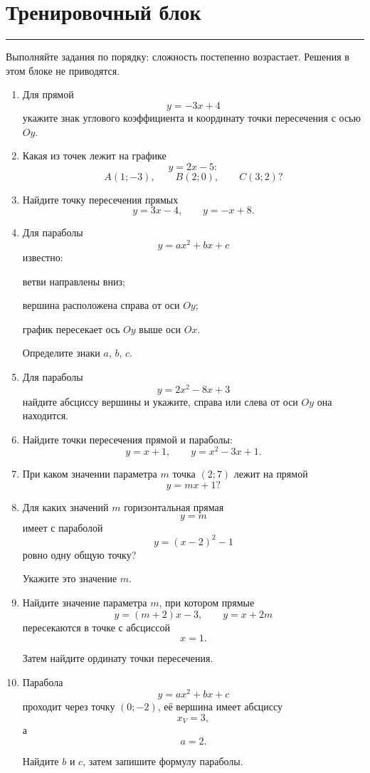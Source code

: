 \documentclass[a4paper,12pt]{article}
\newcommand{\sectionline}{%
  \par\noindent
  \color{accent}\rule{\linewidth}{0.5pt}
  \color{black}\par
}
\begin{document}
\clearpage

\section*{Тренировочный блок}
\sectionline

Выполняйте задания по порядку:
сложность постепенно возрастает.
Решения в этом блоке не приводятся.

\begin{enumerate}

  \item
  Для прямой
  \[
  y=-3x+4
  \]
  укажите знак углового коэффициента и координату точки пересечения с осью $Oy$.

  \item
  Какая из точек лежит на графике
  \[
  y=2x-5:
  \]
  \[
  A(1;-3),
  \qquad
  B(2;0),
  \qquad
  C(3;2)?
  \]

  \item
  Найдите точку пересечения прямых
  \[
  y=3x-4,
  \qquad
  y=-x+8.
  \]

  \item
  Для параболы
  \[
  y=ax^2+bx+c
  \]
  известно:

  ветви направлены вниз;

  вершина расположена справа от оси $Oy$;

  график пересекает ось $Oy$ выше оси $Ox$.

  Определите знаки $a$, $b$, $c$.

  \item
  Для параболы
  \[
  y=2x^2-8x+3
  \]
  найдите абсциссу вершины и укажите,
  справа или слева от оси $Oy$ она находится.

  \item
  Найдите точки пересечения прямой и параболы:
  \[
  y=x+1,
  \qquad
  y=x^2-3x+1.
  \]

  \item
  При каком значении параметра $m$ точка $(2;7)$ лежит на прямой
  \[
  y=mx+1?
  \]

  \item
  Для каких значений $m$ горизонтальная прямая
  \[
  y=m
  \]
  имеет с параболой
  \[
  y=(x-2)^2-1
  \]
  ровно одну общую точку?

  Укажите это значение $m$.

  \item
  Найдите значение параметра $m$, при котором прямые
  \[
  y=(m+2)x-3,
  \qquad
  y=x+2m
  \]
  пересекаются в точке с абсциссой
  \[
  x=1.
  \]

  Затем найдите ординату точки пересечения.

  \item
  Парабола
  \[
  y=ax^2+bx+c
  \]
  проходит через точку $(0;-2)$,
  её вершина имеет абсциссу
  \[
  x_V=3,
  \]
  а
  \[
  a=2.
  \]

  Найдите $b$ и $c$, затем запишите формулу параболы.

\end{enumerate}
\end{document}
